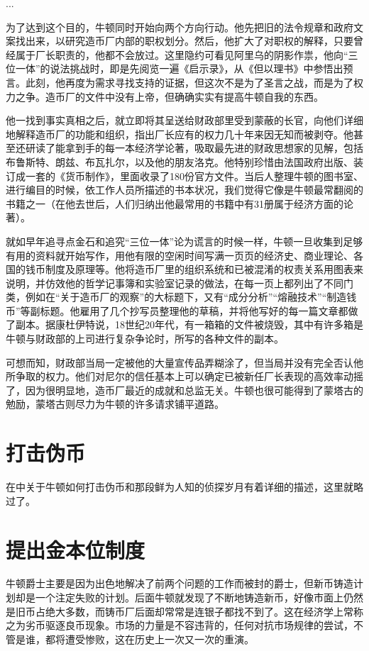 \documentclass[12pt,oneside]{book}
\begin{document}
\begin{bookref}[frametitle={\cite{牛顿传}}]
...

为了达到这个目的，牛顿同时开始向两个方向行动。他先把旧的法令规章和政府文案找出来，以研究造币厂内部的职权划分。然后，他扩大了对职权的解释，只要曾经属于厂长职责的，他都不会放过。这里隐约可看见阿里乌的阴影作祟，他向“三位一体”的说法挑战时，即是先阅览一遍《启示录》，从《但以理书》中参悟出预言。此刻，他再度为需求寻找支持的证据，但这次不是为了圣言之战，而是为了权力之争。造币厂的文件中没有上帝，但确确实实有提高牛顿自我的东西。

他一找到事实真相之后，就立即将其呈送给财政部里受到蒙蔽的长官，向他们详细地解释造币厂的功能和组织，指出厂长应有的权力几十年来因无知而被剥夺。他甚至还研读了能拿到手的每一本经济学论著，吸取最先进的财政思想家的见解，包括布鲁斯特、朗兹、布瓦扎尔，以及他的朋友洛克。他特别珍惜由法国政府出版、装订成一套的《货币制作》，里面收录了180份官方文件。当后人整理牛顿的图书室、进行编目的时候，依工作人员所描述的书本状况，我们觉得它像是牛顿最常翻阅的书籍之一（在他去世后，人们归纳出他最常用的书籍中有31册属于经济方面的论著）。

就如早年追寻点金石和追究“三位一体”论为谎言的时候一样，牛顿一旦收集到足够有用的资料就开始写作，用他有限的空闲时间写满一页页的经济史、商业理论、各国的钱币制度及原理等。他将造币厂里的组织系统和已被混淆的权责关系用图表来说明，并仿效他的哲学记事簿和实验室记录的做法，在每一页上都列出了不同门类，例如在“关于造币厂的观察”的大标题下，又有“成分分析”“熔融技术”“制造钱币”等副标题。他雇用了几个抄写员整理他的草稿，并将他写好的每一篇文章都做了副本。据康杜伊特说，18世纪20年代，有一箱箱的文件被烧毁，其中有许多箱是牛顿与财政部的上司进行复杂争论时，所写的各种文件的副本。

可想而知，财政部当局一定被他的大量宣传品弄糊涂了，但当局并没有完全否认他所争取的权力。他们对尼尔的信任基本上可以确定已被新任厂长表现的高效率动摇了，因为很明显地，造币厂最近的成就和总监无关。牛顿也很可能得到了蒙塔古的勉励，蒙塔古则尽力为牛顿的许多请求铺平道路。
\end{bookref}



\section{打击伪币}
在\cite{牛顿与伪币制造者}中关于牛顿如何打击伪币和那段鲜为人知的侦探岁月有着详细的描述，这里就略过了。


\section{提出金本位制度}
牛顿爵士主要是因为出色地解决了前两个问题的工作而被封的爵士，但新币铸造计划却是一个注定失败的计划。后面牛顿就发现了不断地铸造新币，好像市面上仍然是旧币占绝大多数，而铸币厂后面却常常是连银子都找不到了。这在经济学上常称之为劣币驱逐良币现象。市场的力量是不容违背的，任何对抗市场规律的尝试，不管是谁，都将遭受惨败，这在历史上一次又一次的重演。
\end{document}
